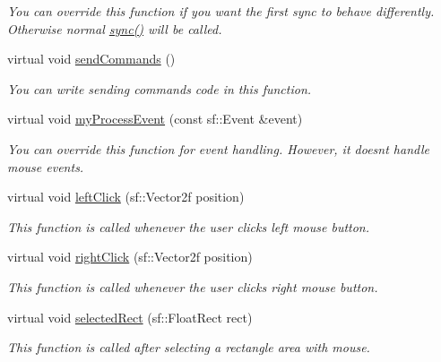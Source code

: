 \begin{DoxyCompactItemize}
\begin{DoxyCompactList}\small\item\em You can override this function if you want the first sync to behave differently. Otherwise normal \hyperlink{classGame_aab44617eccac431efb47e8737740b9f6}{sync()} will be called. \end{DoxyCompactList}\item 
virtual void \hyperlink{classGame_adcfb81710141ae68ff1e4571aaed2555}{send\+Commands} ()
\begin{DoxyCompactList}\small\item\em You can write sending commands code in this function. \end{DoxyCompactList}\item 
virtual void \hyperlink{classGame_a0e97a7944c35890bfec2910074cf5f23}{my\+Process\+Event} (const sf\+::\+Event \&event)
\begin{DoxyCompactList}\small\item\em You can override this function for event handling. However, it doesn\textquotesingle{}t handle mouse events. \end{DoxyCompactList}\item 
virtual void \hyperlink{classGame_a45559f72d8a850d2acc62f6439400e7e}{left\+Click} (sf\+::\+Vector2f position)
\begin{DoxyCompactList}\small\item\em This function is called whenever the user clicks left mouse button. \end{DoxyCompactList}\item 
virtual void \hyperlink{classGame_a1b9835bd630043b37243c43b6d46f73a}{right\+Click} (sf\+::\+Vector2f position)
\begin{DoxyCompactList}\small\item\em This function is called whenever the user clicks right mouse button. \end{DoxyCompactList}\item 
virtual void \hyperlink{classGame_a4f239a4d2ac903b55620b7f52e4d2fe0}{selected\+Rect} (sf\+::\+Float\+Rect rect)
\begin{DoxyCompactList}\small\item\em This function is called after selecting a rectangle area with mouse. \end{DoxyCompactList}\end{DoxyCompactItemize}
